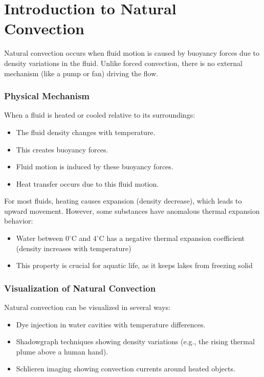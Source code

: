 \section*{Introduction to Natural Convection}
Natural convection occurs when fluid motion is caused by buoyancy forces due to density variations in the fluid. Unlike forced convection, there is no external mechanism (like a pump or fan) driving the flow.
\subsubsection*{Physical Mechanism}
When a fluid is heated or cooled relative to its surroundings:
%
\begin{itemize}
    \item The fluid density changes with temperature.
    \item This creates buoyancy forces.
    \item Fluid motion is induced by these buoyancy forces.
    \item Heat transfer occurs due to this fluid motion.
\end{itemize}
%
For most fluids, heating causes expansion (density decrease), which leads to upward movement. However, some substances have anomalous thermal expansion behavior:
\begin{itemize}
    \item Water between $0^\circ \mathrm{C}$ and $4^\circ \mathrm{C}$ has a negative thermal expansion coefficient (density increases with temperature)
    \item This property is crucial for aquatic life, as it keeps lakes from freezing solid
\end{itemize}
\subsubsection*{Visualization of Natural Convection}
Natural convection can be visualized in several ways:
\begin{itemize}
    \item Dye injection in water cavities with temperature differences.
    \item Shadowgraph techniques showing density variations (e.g., the rising thermal plume above a human hand).
    \item Schlieren imaging showing convection currents around heated objects.
\end{itemize}

